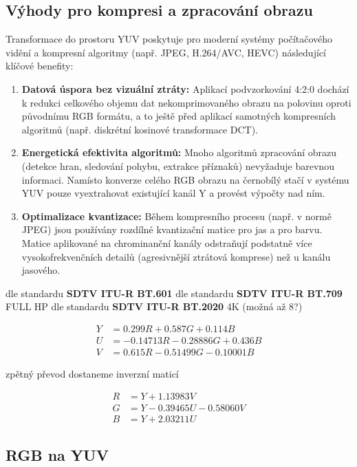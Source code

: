 \subsection{Výhody pro kompresi a zpracování obrazu}

Transformace do prostoru YUV poskytuje pro moderní systémy počítačového vidění a kompresní algoritmy (např. JPEG, H.264/AVC, HEVC) následující klíčové benefity:

\begin{enumerate}
    \item \textbf{Datová úspora bez vizuální ztráty:} Aplikací podvzorkování 4:2:0 dochází k redukci celkového objemu dat nekomprimovaného obrazu na polovinu oproti původnímu RGB formátu, a to ještě před aplikací samotných kompresních algoritmů (např. diskrétní kosinové transformace DCT).
    \item \textbf{Energetická efektivita algoritmů:} Mnoho algoritmů zpracování obrazu (detekce hran, sledování pohybu, extrakce příznaků) nevyžaduje barevnou informaci. Namísto konverze celého RGB obrazu na černobílý stačí v systému YUV pouze vyextrahovat existující kanál Y a provést výpočty nad ním.
    \item \textbf{Optimalizace kvantizace:} Během kompresního procesu (např. v normě JPEG) jsou používány rozdílné kvantizační matice pro jas a pro barvu. Matice aplikované na chrominanční kanály odstraňují podstatně více vysokofrekvenčních detailů (agresivnější ztrátová komprese) než u kanálu jasového.
\end{enumerate}


dle standardu \textbf{SDTV ITU-R BT.601}
dle standardu \textbf{SDTV ITU-R BT.709} FULL HP
dle standardu \textbf{SDTV ITU-R BT.2020} 4K (možná až 8?)

\[\begin{aligned}
Y &= 0.299R + 0.587G + 0.114B \\
U &= -0.14713R - 0.28886G + 0.436B \\
V &= 0.615R - 0.51499G - 0.10001B
\end{aligned}\]

zpětný převod dostaneme inverzní maticí

\[\begin{aligned}
R &= Y + 1.13983V \\
G &= Y - 0.39465U - 0.58060V \\
B &= Y + 2.03211U
\end{aligned}\]

\subsection{RGB na YUV}
